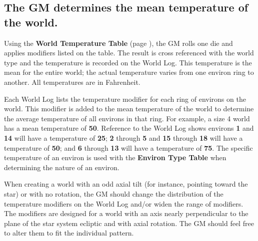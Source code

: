 \subsection[Temperature]{The GM determines the mean temperature of
  the world.}
\label{sec:world-temp}

Using the \textbf{World Temperature Table} (page
\pageref{tab:world-temp}), the GM rolls one die and applies modifiers
listed on the table. The result is cross referenced with the world
type and the temperature is recorded on the World Log. This
temperature is the mean for the entire world; the actual temperature
varies from one environ ring to another. All temperatures are in
Fahrenheit.

Each World Log lists the temperature modifier for each ring of
environs on the world. This modifier is added to the mean temperature
of the world to determine the average temperature of all environs in
that ring. For example, a size 4 world has a mean temperature of
\textbf{50\textdegree}. Reference to the World Log shows environs
\textbf{1} and \textbf{14} will have a temperature of
\textbf{25\textdegree}; \textbf{2} through \textbf{5} and \textbf{15}
through \textbf{18} will have a temperature of \textbf{50\textdegree};
and \textbf{6} through \textbf{13} will have a temperature of
\textbf{75\textdegree}. The specific temperature of an environ is used
with the \textbf{Environ Type Table} when determining the nature of an
environ.

When creating a world with an odd axial tilt (for instance, pointing
toward the star) or with no rotation, the GM should change the
distribution of the temperature modifiers on the World Log and/or
widen the range of modifiers. The modifiers are designed for a world
with an axis nearly perpendicular to the plane of the star system
ecliptic and with axial rotation. The GM should feel free to alter
them to fit the individual pattern.


